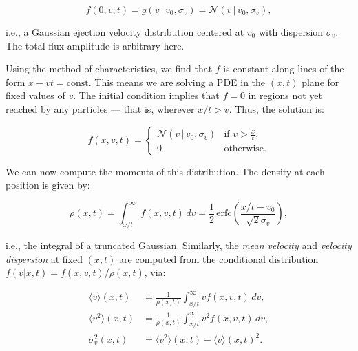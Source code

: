             \begin{equation}
                f(0,v,t) = g(v \,|\, v_0, \sigma_v) = \mathcal{N}(v \,|\, v_0, \sigma_v),
            \end{equation}

            i.e., a Gaussian ejection velocity distribution centered at \( v_0 \) with dispersion \( \sigma_v \). The total flux amplitude is arbitrary here.

            Using the method of characteristics, we find that \( f \) is constant along lines of the form \( x - vt = \text{const} \). This means we are solving a PDE in the \( (x,t) \) plane for fixed values of \( v \). The initial condition implies that \( f=0 \) in regions not yet reached by any particles — that is, wherever \( x/t > v \). Thus, the solution is:

            \begin{equation}
                f(x,v,t) = 
                \begin{cases}
                    \mathcal{N}(v \,|\, v_0, \sigma_v) & \text{if } v > \frac{x}{t}, \\
                    0 & \text{otherwise}.
                \end{cases}
                \label{eq:one_dimensional_collisionless_streaming}
            \end{equation}

            We can now compute the moments of this distribution. The density at each position is given by:

            \begin{equation}
                \rho(x,t) = \int_{x/t}^{\infty} f(x,v,t) \, dv = \frac{1}{2} \, \mathrm{erfc}\left( \frac{x/t - v_0}{\sqrt{2}\sigma_v} \right),
            \end{equation}

            i.e., the integral of a truncated Gaussian. Similarly, the \textit{mean velocity} and \textit{velocity dispersion} at fixed \( (x,t) \) are computed from the conditional distribution \( f(v|x,t) = f(x,v,t)/\rho(x,t) \), via:

            \begin{align}
                \langle v \rangle(x,t) &= \frac{1}{\rho(x,t)} \int_{x/t}^\infty v f(x,v,t) \, dv, \\
                \langle v^2 \rangle(x,t) &= \frac{1}{\rho(x,t)} \int_{x/t}^\infty v^2 f(x,v,t) \, dv, \\
                \sigma_v^2(x,t) &= \langle v^2 \rangle(x,t) - \langle v \rangle(x,t)^2.
            \end{align}

